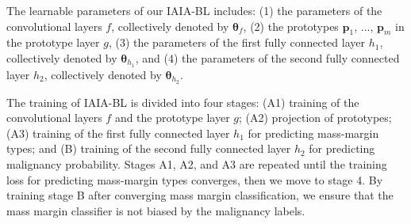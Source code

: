 \documentclass[11pt]{article}
\begin{document}
The learnable parameters of our IAIA-BL includes: (1) the parameters of the convolutional layers $f$, collectively denoted by $\mathbf{\theta}_f$, (2) the prototypes $\mathbf{p}_1$, ..., $\mathbf{p}_m$ in the prototype layer $g$, (3) the parameters of the first fully connected layer $h_1$, collectively denoted by $\mathbf{\theta}_{h_1}$, and (4) the parameters of the second fully connected layer $h_2$, collectively denoted by $\mathbf{\theta}_{h_2}$. 

The training of IAIA-BL is divided into four stages: (A1) training of the convolutional layers $f$ and the prototype layer $g$; (A2) projection of prototypes; (A3) training of the first fully connected layer $h_1$ for predicting mass-margin types; and (B) training of the second fully connected layer $h_2$ for predicting malignancy probability. Stages A1, A2, and A3 are repeated until the training loss for predicting mass-margin types converges, then we move to stage 4. By training stage B after converging  mass margin classification, we ensure that the mass margin classifier is not biased by the malignancy labels.
    
\end{document}
